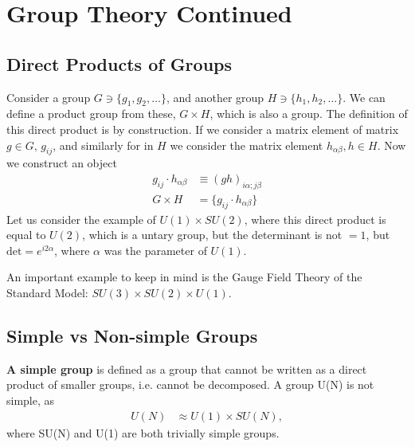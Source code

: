 \documentclass[relqm.tex]{subfiles}
\begin{document}
\section{Group Theory Continued}
\subsection{Direct Products of Groups}
Consider a group $G \ni \{g_1,g_2,\dots\}$, and another group $H \ni \{h_1,h_2,\dots\}$.
We can define a product group from these, $G\times H$, which is also a group. 
The definition of this direct product is by construction.
If we consider a matrix element of matrix $g \in G,\, g_{ij}$, and similarly for in $H$ we consider the matrix element $h_{\alpha\beta}, h \in H$.
Now we construct an object
\begin{align}
    g_{ij}\cdot h_{\alpha\beta} &\equiv (gh)_{i\alpha;j\beta} \\
    G\times H &= \{g_{ij}\cdot h_{\alpha\beta}\}
\end{align}
Let us consider the example of $U(1)\times SU(2)$, where this direct product is equal to $U(2)$, which is a untary group, but the determinant is not $=1$, but $\text{det}=e^{i2\alpha}$, where $\alpha$ was the parameter of $U(1)$.

An important example to keep in mind is the Gauge Field Theory of the Standard Model: $SU(3)\times SU(2)\times U(1)$.

\subsection{Simple vs Non-simple Groups}
\textbf{A simple group} is defined as a group that cannot be written as a direct product of smaller groups, i.e. cannot be decomposed.
A group U(N) is not simple, as
\begin{align}
    U(N) &\approx U(1)\times SU(N),
\end{align}
where SU(N) and U(1) are both trivially simple groups. 
\end{document}
